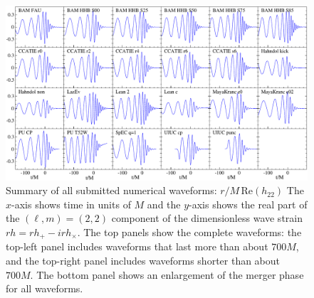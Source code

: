 \begin{figure}
\includegraphics[width=\textwidth]{figures/ninja1/Prune_Re_h22-Merger}
\caption[Summary of waveforms contributed to NINJA-1]{
\label{fig:NR-Reh22}
Summary of all submitted numerical waveforms:
\boldmath$r/M\,\mbox{Re}(h_{22})$ The $x$-axis shows time in units of
$M$ and the $y$-axis shows the real part of the $(\ell,m)=(2,2)$
component of the dimensionless wave strain $r h = r h_+ - i r
h_\times$.  The top panels show the complete waveforms: the top-left
panel includes waveforms that last more than about $700M$, and the
top-right panel includes waveforms shorter than about $700M$. The
bottom panel shows an enlargement of the merger phase for all
waveforms.}
\end{figure}


